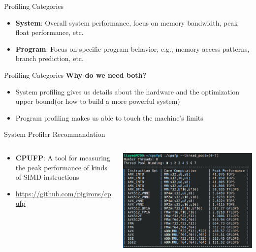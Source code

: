 \begin{frame}{Profiling Categories}
      \begin{itemize}
          \item \textbf{System}: Overall system performance, focus on memory bandwidth, peak float performance, etc.
          \item \textbf{Program}: Focus on specific program behavior, e.g., memory access patterns, branch prediction, etc.
      \end{itemize}
   
\end{frame}

\begin{frame}{Profiling Categories}
    \textbf{Why do we need both?}
    \begin{itemize}
        \item System profiling gives us details about the hardware and the optimization upper bound(or how to build a more powerful system)
        \item Program profiling makes us able to touch the machine's limits
    \end{itemize}
\end{frame}

\begin{frame}{System Profiler Recommandation}
    \begin{columns}
        \begin{column}{0.5\textwidth}
            \begin{itemize}
                \item \textbf{CPUFP}: A tool for measuring the peak performance of kinds of SIMD instructions
                \item \footnotesize{\url{https://github.com/pigirons/cpufp}}
            \end{itemize}
        \end{column}
        \begin{column}{0.5\textwidth}
            \centering
            \includegraphics[width=\textwidth]{img/cpufp.png}
        \end{column}
    \end{columns}
\end{frame}

